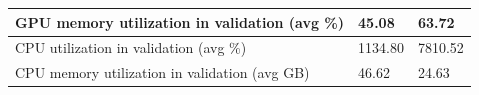 \begin{table}[!htb]
\begin{tabular}{l|l|l|}
\multicolumn{1}{|l|}{GPU memory utilization in validation (avg \%)} &                   45.08                   &                                     63.72     \\ \hline
\multicolumn{1}{|l|}{CPU utilization in validation (avg \%)}        &                  1134.80                    &                                  7810.52        \\ \hline
\multicolumn{1}{|l|}{CPU memory utilization in validation (avg GB)} &                   46.62                   &                                     24.63     \\ \hline
\end{tabular}
\end{table}
